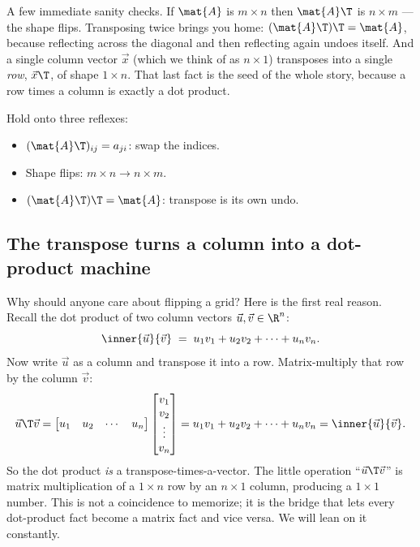 A few immediate sanity checks. If $\mat{A}$ is $m\times n$ then $\mat{A}\T$ is $n\times m$ --- the
shape flips. Transposing twice brings you home: $(\mat{A}\T)\T = \mat{A}$, because reflecting across
the diagonal and then reflecting again undoes itself. And a single column vector $\vec{x}$ (which we
think of as $n\times 1$) transposes into a single \emph{row}, $\vec{x}\T$, of shape $1\times n$. That
last fact is the seed of the whole story, because a row times a column is exactly a dot product.

\begin{focusbox}
Hold onto three reflexes:
\begin{itemize}
  \item $(\mat{A}\T)_{ij} = a_{ji}$: swap the indices.
  \item Shape flips: $m\times n \to n\times m$.
  \item $(\mat{A}\T)\T = \mat{A}$: transpose is its own undo.
\end{itemize}
\end{focusbox}

\subsection{The transpose turns a column into a dot-product machine}

Why should anyone care about flipping a grid? Here is the first real reason. Recall the dot product
of two column vectors $\vec{u},\vec{v}\in\R^n$:
\[
  \inner{\vec{u}}{\vec{v}} \;=\; u_1 v_1 + u_2 v_2 + \cdots + u_n v_n.
\]
Now write $\vec{u}$ as a column and transpose it into a row. Matrix-multiply that row by the column
$\vec{v}$:
\[
  \vec{u}\T \vec{v}
  = \begin{bmatrix} u_1 & u_2 & \cdots & u_n \end{bmatrix}
    \begin{bmatrix} v_1 \\ v_2 \\ \vdots \\ v_n \end{bmatrix}
  = u_1v_1 + u_2v_2 + \cdots + u_nv_n
  = \inner{\vec{u}}{\vec{v}}.
\]
So the dot product \emph{is} a transpose-times-a-vector. The little operation ``$\vec{u}\T\vec{v}$''
is matrix multiplication of a $1\times n$ row by an $n\times 1$ column, producing a $1\times 1$
number. This is not a coincidence to memorize; it is the bridge that lets every dot-product fact
become a matrix fact and vice versa. We will lean on it constantly.

